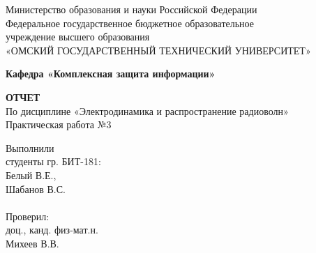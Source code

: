 \documentclass[fontsize=14pt,a4paper]{scrartcl}
\begin{document}
  \begin{titlepage}                                                         
    \newpage                                                                        
    \begin{center}   
      Министерство образования и науки Российской Федерации  \\ 
      \vspace{1em}                                                    
      {\mdseries
        Федеральное государственное бюджетное образовательное \\
        учреждение высшего образования \\
        «ОМСКИЙ ГОСУДАРСТВЕННЫЙ ТЕХНИЧЕСКИЙ УНИВЕРСИТЕТ»
      }                               
      \vspace{1em}      

      {\bfseries Кафедра «Комплексная защита информации»}  

      \vspace{\fill}                                                         
                                   
      {\bfseries ОТЧЕТ } \\                                 
      По дисциплине «Электродинамика и распространение радиоволн» \\ 
      \vspace{1em} 
      Практическая работа №3 \\                                                           
    \end{center}                                                          
                                                                                        
    \vspace{\fill}                                                         
                                                                                        
    \hfill\parbox{5cm}{
      Выполнили\\
      студенты гр. БИТ-181:\\
      Белый В.Е., \\
      Шабанов В.С.\\
      \\
      Проверил:\\
      доц., канд. физ-мат.н. \\
      Михеев В.В.\\
    }                                                                                                                              
                                                                                                                                                                              

\end{titlepage}
\end{document}
